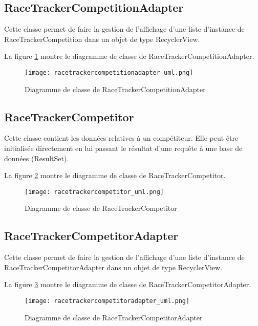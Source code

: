 \subsection{RaceTrackerCompetitionAdapter}

Cette classe permet de faire la gestion de l'affichage d'une liste d'instance de RaceTrackerCompetition dans un objet de type RecyclerView.

La figure \ref{fig:racetrackercompetitionadapter_uml} montre le diagramme de classe de RaceTrackerCompetitionAdapter.

\begin{figure}[htb]
\centering 
\texttt{[image: racetrackercompetitionadapter\_uml.png]} 
\caption{Diagramme de classe de RaceTrackerCompetitionAdapter}
\label{fig:racetrackercompetitionadapter_uml}
 \end{figure}

\subsection{RaceTrackerCompetitor}

Cette classe contient les données relatives à un compétiteur. Elle peut être initialisée directement en lui passant le résultat d'une requête à une base de données (ResultSet).

La figure \ref{fig:racetrackercompetitor_uml} montre le diagramme de classe de RaceTrackerCompetitor.

\begin{figure}[htb]
\centering 
\texttt{[image: racetrackercompetitor\_uml.png]} 
\caption{Diagramme de classe de RaceTrackerCompetitor}
\label{fig:racetrackercompetitor_uml}
 \end{figure}

\subsection{RaceTrackerCompetitorAdapter}

Cette classe permet de faire la gestion de l'affichage d'une liste d'instance de RaceTrackerCompetitorAdapter dans un objet de type RecyclerView.

La figure \ref{fig:racetrackercompetitoradapter_uml} montre le diagramme de classe de RaceTrackerCompetitorAdapter.

\begin{figure}[htb]
\centering 
\texttt{[image: racetrackercompetitoradapter\_uml.png]} 
\caption{Diagramme de classe de RaceTrackerCompetitorAdapter}
\label{fig:racetrackercompetitoradapter_uml}
 \end{figure}

